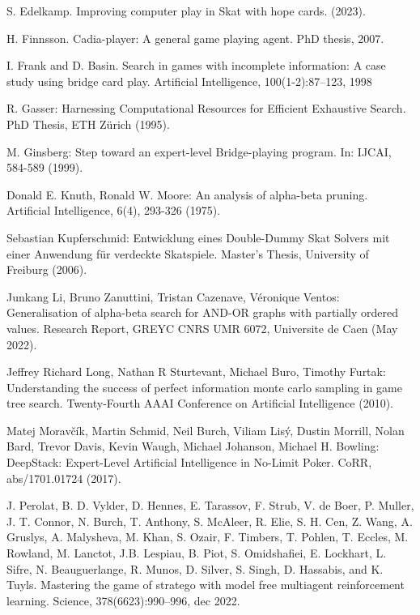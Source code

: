 \documentclass[runningheads]{llncs}
\begin{document}
\begin{thebibliography}{8}
    S. Edelkamp. Improving computer play in Skat with hope cards. (2023).

    H. Finnsson. Cadia-player: A general game playing agent. PhD thesis, 2007.

    I. Frank and D. Basin. Search in games with incomplete information: A case study using bridge card play. Artificial Intelligence, 100(1-2):87–123, 1998

    R. Gasser: Harnessing Computational Resources for Efficient Exhaustive Search. PhD Thesis, ETH Zürich (1995).

    M. Ginsberg: Step toward an expert-level Bridge-playing program. In: IJCAI, 584-589 (1999).

    Donald E. Knuth, Ronald W. Moore: An analysis of alpha-beta pruning. Artificial Intelligence, 6(4), 293-326 (1975).

    Sebastian Kupferschmid: Entwicklung eines Double-Dummy Skat Solvers mit einer Anwendung für verdeckte Skatspiele. Master's Thesis, University of Freiburg (2006).

    Junkang Li, Bruno Zanuttini, Tristan Cazenave, Véronique Ventos: Generalisation of alpha-beta search for AND-OR graphs with partially ordered values. Research Report, GREYC CNRS UMR 6072, Universite de Caen (May 2022).

    Jeffrey Richard Long, Nathan R Sturtevant, Michael Buro, Timothy Furtak: Understanding the success of perfect information monte carlo sampling in game tree search. Twenty-Fourth AAAI Conference on Artificial Intelligence (2010).

    Matej Moravčík, Martin Schmid, Neil Burch, Viliam Lisý, Dustin Morrill, Nolan Bard, Trevor Davis, Kevin Waugh, Michael Johanson, Michael H. Bowling: DeepStack: Expert-Level Artificial Intelligence in No-Limit Poker. CoRR, abs/1701.01724 (2017).

    J. Perolat, B. D. Vylder, D. Hennes, E. Tarassov, F. Strub, V. de Boer, P. Muller, J. T. Connor, N. Burch, T. Anthony, S. McAleer, R. Elie, S. H. Cen, Z. Wang, A. Gruslys, A. Malysheva, M. Khan, S. Ozair, F. Timbers, T. Pohlen, T. Eccles, M. Rowland, M. Lanctot, J.B. Lespiau, B. Piot, S. Omidshafiei, E. Lockhart, L. Sifre, N. Beauguerlange, R. Munos, D. Silver, S. Singh, D. Hassabis, and K. Tuyls. Mastering the game of stratego with model free multiagent reinforcement learning. Science, 378(6623):990–996, dec 2022.


\end{thebibliography}
\end{document}

